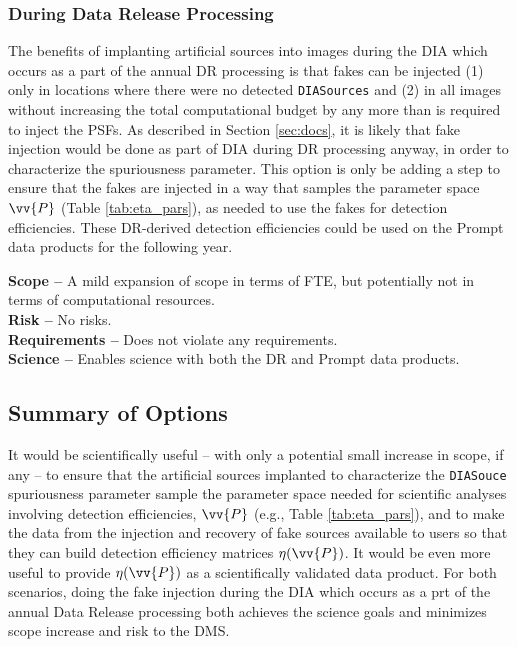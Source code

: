 \documentclass[DM,lsstdraft,toc]{lsstdoc}
\begin{document}
\subsubsection{During Data Release Processing}\label{sssec:opts_fakeswhen_DR}

The benefits of implanting artificial sources into images during the DIA which occurs as a part of the annual DR processing is that fakes can be injected (1) only in locations where there were no detected {\tt DIASources} and (2) in all images without increasing the total computational budget by any more than is required to inject the PSFs. As described in Section \ref{sec:docs}, it is likely that fake injection would be done as part of DIA during DR processing anyway, in order to characterize the spuriousness parameter. This option is only be adding a step to ensure that the fakes are injected in a way that samples the parameter space $\vv{P}$ (Table \ref{tab:eta_pars}), as needed to use the fakes for detection efficiencies. These DR-derived detection efficiencies could be used on the Prompt data products for the following year. 

{\bf Scope --} A mild expansion of scope in terms of FTE, but potentially not in terms of computational resources. \\
{\bf Risk --} No risks. \\
{\bf Requirements --} Does not violate any requirements. \\
{\bf Science --} Enables science with both the DR and Prompt data products. 

\subsection{Summary of Options}\label{ssec:opts_sum}

It would be scientifically useful -- with only a potential small increase in scope, if any -- to ensure that the artificial sources implanted to characterize the {\tt DIASouce} spuriousness parameter sample the parameter space needed for scientific analyses involving detection efficiencies, $\vv{P}$ (e.g., Table \ref{tab:eta_pars}), and to make the data from the injection and recovery of fake sources available to users so that they can build detection efficiency matrices $\eta(\vv{P})$. It would be even more useful to provide $\eta(\vv{P})$ as a scientifically validated data product. For both scenarios, doing the fake injection during the DIA which occurs as a prt of the annual Data Release processing both achieves the science goals and minimizes scope increase and risk to the DMS.
\end{document}
